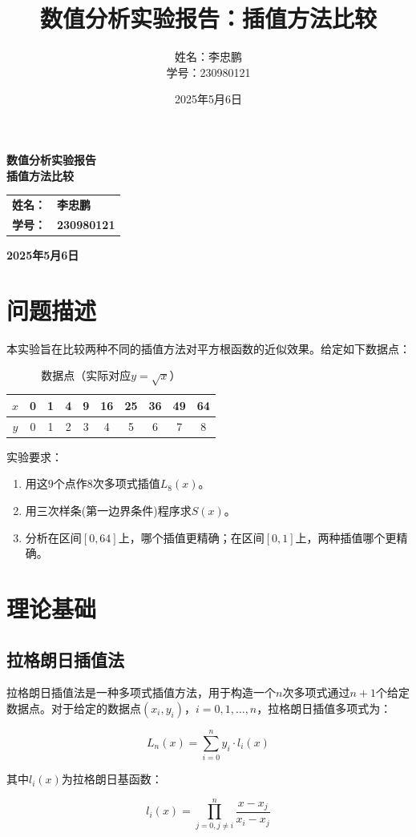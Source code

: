 \documentclass{article}
\title{\Large\textbf{数值分析实验报告：插值方法比较}}
\author{\large 姓名：李忠鹏 \\ \large 学号：230980121}
\date{\large 2025年5月6日}
\renewcommand{\maketitle}{
  \begin{titlepage}
    \begin{center}
      \vspace*{2cm}
      
      {\Huge\bfseries 数值分析实验报告 \\[0.5cm]}
      {\LARGE\bfseries 插值方法比较 \\[2cm]}
      
      \begin{tabular}{rl}
        \Large\textbf{姓名：} & \Large\textbf{李忠鹏} \\[0.5cm]
        \Large\textbf{学号：} & \Large\textbf{230980121} \\[2cm]
      \end{tabular}
      
      \vfill
      
      {\Large\bfseries 2025年5月6日}
    \end{center}
  \end{titlepage}
}
\begin{document}
\maketitle

\tableofcontents
\clearpage

\section{问题描述}
本实验旨在比较两种不同的插值方法对平方根函数的近似效果。给定如下数据点：

\begin{table}[H]
\centering
\begin{tabular}{|c|ccccccccc|}
\hline
$x$ & 0 & 1 & 4 & 9 & 16 & 25 & 36 & 49 & 64 \\
\hline
$y$ & 0 & 1 & 2 & 3 & 4 & 5 & 6 & 7 & 8 \\
\hline
\end{tabular}
\caption{数据点（实际对应$y=\sqrt{x}$）}
\end{table}

实验要求：
\begin{enumerate}
    \item 用这9个点作8次多项式插值$L_8(x)$。
    \item 用三次样条(第一边界条件)程序求$S(x)$。
    \item 分析在区间$[0,64]$上，哪个插值更精确；在区间$[0,1]$上，两种插值哪个更精确。
\end{enumerate}

\section{理论基础}

\subsection{拉格朗日插值法}
拉格朗日插值法是一种多项式插值方法，用于构造一个$n$次多项式通过$n+1$个给定数据点。对于给定的数据点$(x_i, y_i)$，$i=0,1,\ldots,n$，拉格朗日插值多项式为：

\begin{equation}
L_n(x) = \sum_{i=0}^{n} y_i \cdot l_i(x)
\end{equation}

其中$l_i(x)$为拉格朗日基函数：

\begin{equation}
l_i(x) = \prod_{j=0,j\neq i}^{n} \frac{x-x_j}{x_i-x_j}
\end{equation}
\end{document}

